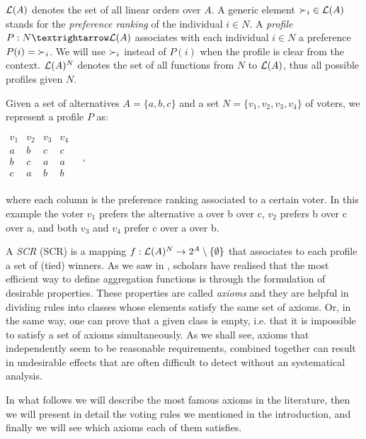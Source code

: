 $\mathcal{L}(A)$ denotes the set of all linear orders over $A$. A generic element $\mathbin{\prefi} \in \linors$ stands for the \textit{preference ranking} of the individual $i\in N$.
A \emph{profile} $\prof: N → \linors$ associates with each individual $i \in N$ a preference $\prof(i) =\mathbin{\prefi}$. We will use $\mathbin{\prefi}$ instead of $P(i)$ when the profile is clear from the context. $\mathcal{L}(A)^{N}$ denotes the set of all functions from $N$ to $\mathcal{L}(A)$, thus all possible profiles given $N$.
\begin{example}
	\label{ex:namedprofile}
	Given a set of alternatives $A=\{a,b,c\}$ and a set $N=\{v_1,v_2,v_3,v_4\}$ of voters, we represent a profile $P$ as:
	\begin{center}
		$
		\begin{array}{cccc}
			v_1 & v_2 & v_3 & v_4\\
			a &	b & c & c \\
			b &	c & a & a \\
			c &	a & b & b \\
		\end{array} \quad, 
		$
	\end{center}
	where each column is the preference ranking associated to a certain voter. In this example the voter $v_1$ prefers the alternative a over b over c, $v_2$ prefers b over c over a, and both $v_3$ and $v_4$ prefer c over a over b.
\end{example}

A \emph{\acl{SCR}} (\acs{SCR}) is a mapping $f:\mathcal{L}(A)^{N}\rightarrow 2^{A} \setminus \{\emptyset \}$ that associates to each profile a set of (tied) winners. 
As we saw in , scholars have realised that the most efficient way to define aggregation functions is through the formulation of desirable properties.
These properties are called \textit{axioms} and they are helpful in dividing rules into classes whose elements satisfy the same set of axioms.
Or, in the same way, one can prove that a given class is empty, i.e. that it is impossible to satisfy a set of axioms simultaneously.
As we shall see, axioms that independently seem to be reasonable requirements, combined together can result in undesirable effects that are often difficult to detect without an systematical analysis.

In what follows we will describe the most famous axioms in the literature, then we will present in detail the voting rules we mentioned in the introduction, and finally we will see which axioms each of them satisfies.

